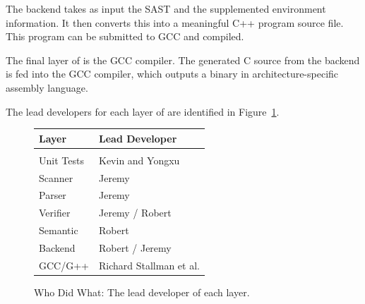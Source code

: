 
The backend takes as input the SAST and the supplemented environment
information. It then converts this into a meaningful C++ program source
file. This program can be submitted to GCC and compiled.

The final layer of \sys{} is the GCC compiler. The generated C source from
the backend is fed into the GCC compiler, which outputs a binary in
architecture-specific assembly language.

The lead developers for each layer of \sys{} are identified in
Figure~\ref{fig:leads}.


\begin{figure}
\begin{center}
\begin{tabular}{l | l}
{\bf Layer} & {\bf Lead Developer} \\
\hline \\
Unit Tests & Kevin and Yongxu \\
Scanner & Jeremy \\
Parser & Jeremy \\
Verifier & Jeremy / Robert \\
Semantic & Robert \\
Backend & Robert / Jeremy \\
GCC/G++ & Richard Stallman et al. \\
\end{tabular}
\caption{Who Did What: The lead developer of each layer.}
\label{fig:leads}
\end{center}
\end{figure}


